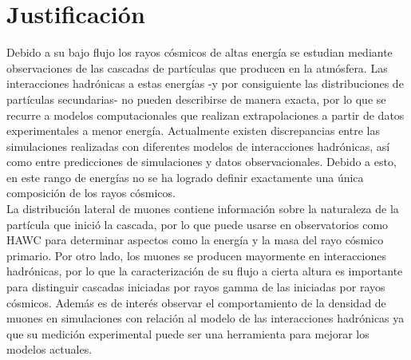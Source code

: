%

\section{Justificación}
Debido a su bajo flujo los rayos cósmicos de altas energía se estudian mediante observaciones de las cascadas de partículas que producen en la atmósfera. Las interacciones hadr\'onicas a estas energ\'ias -y por consiguiente las distribuciones de part\'iculas secundarias- no pueden describirse de manera exacta, por lo que se recurre a modelos computacionales que realizan extrapolaciones a partir de datos experimentales a menor energ\'ia. Actualmente existen discrepancias entre las simulaciones realizadas con diferentes modelos de interacciones hadrónicas, así como entre predicciones de simulaciones y datos observacionales. Debido a esto, en este rango de energ\'ias no se ha logrado definir exactamente una \'unica composici\'on de los rayos c\'osmicos. \\

La distribuci\'on lateral de muones contiene informaci\'on sobre la naturaleza de la part\'icula que inici\'o la cascada, por lo que puede usarse en observatorios como HAWC para determinar aspectos como la energ\'ia y la masa del rayo c\'osmico primario. Por otro lado, los muones se producen mayormente en interacciones hadr\'onicas, por lo que la caracterizaci\'on de su flujo a cierta altura es importante para distinguir cascadas iniciadas por rayos gamma de las iniciadas por rayos c\'osmicos. Adem\'as es de inter\'es observar el comportamiento de la densidad de muones en simulaciones con relaci\'on al modelo de las interacciones hadr\'onicas ya que su medici\'on experimental puede ser una herramienta para mejorar los modelos actuales.

